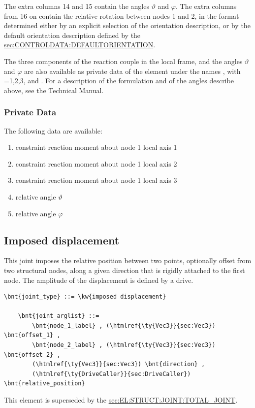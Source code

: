 The extra columns 14 and 15 contain the angles $\vartheta$ and $\varphi$.
The extra columns from 16 on contain the relative rotation
between nodes 1 and 2, in the format determined either by an explicit
selection of the orientation description, or by the default
orientation description defined by the 
\hyperref{\kw{default orientation} keyword}{\kw{default orientation} keyword (see Section~}{)}{sec:CONTROLDATA:DEFAULTORIENTATION}.

The three components of the reaction couple in the local frame, 
and the angles $\vartheta$ and $\varphi$ are also available
as private data of the element under the names ,
with =1,2,3,  and .
For a description of the formulation and of the angles describe above,
see the Technical Manual.

\subsubsection{Private Data}
The following data are available:
\begin{enumerate}
\item {} constraint reaction moment about node 1 local axis 1
\item {} constraint reaction moment about node 1 local axis 2
\item {} constraint reaction moment about node 1 local axis 3
\item {} relative angle $\vartheta$
\item {} relative angle $\varphi$
\end{enumerate}



\subsection{Imposed displacement}
\label{sec:EL:JOINT:IMPOSEDDISPLACEMENT}
This joint imposes the relative position between two points,
optionally offset from two structural nodes,
along a given direction that is rigidly attached to the first node.
The amplitude of the displacement is defined by a drive.
\begin{Verbatim}[commandchars=\\\{\}]
    \bnt{joint_type} ::= \kw{imposed displacement}

    \bnt{joint_arglist} ::= 
        \bnt{node_1_label} , (\htmlref{\ty{Vec3}}{sec:Vec3}) \bnt{offset_1} ,
        \bnt{node_2_label} , (\htmlref{\ty{Vec3}}{sec:Vec3}) \bnt{offset_2} ,
        (\htmlref{\ty{Vec3}}{sec:Vec3}) \bnt{direction} ,
        (\htmlref{\ty{DriveCaller}}{sec:DriveCaller}) \bnt{relative_position}
\end{Verbatim}
This element is superseded by the
\hyperref{\kw{total joint}}{\kw{total joint}, see Section~}{}{sec:EL:STRUCT:JOINT:TOTAL_JOINT}.

